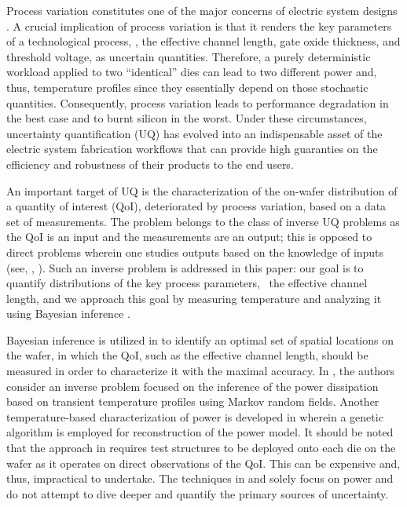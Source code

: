 Process variation constitutes one of the major concerns of electric system designs \cite{srivastava2010}. A crucial implication of process variation is that it renders the key parameters of a technological process, \eg, the effective channel length, gate oxide thickness, and threshold voltage, as uncertain quantities.
Therefore, a purely deterministic workload applied to two ``identical'' dies can lead to two different power and, thus, temperature profiles since they essentially depend on those stochastic quantities. Consequently, process variation leads to performance degradation in the best case and to burnt silicon in the worst.
Under these circumstances, uncertainty quantification (UQ) has evolved into an indispensable asset of the electric system fabrication workflows that can provide high guaranties on the efficiency and robustness of their products to the end users.

An important target of UQ is the characterization of the on-wafer distribution of a quantity of interest (QoI), deteriorated by process variation, based on a data set of measurements. The problem belongs to the class of inverse UQ problems as the QoI is an input and the measurements are an output; this is opposed to direct problems wherein one studies outputs based on the knowledge of inputs (see, \eg, \cite{juan2011, juan2012}).
Such an inverse problem is addressed in this paper: our goal is to quantify distributions of the key process parameters, \eg\ the effective channel length, and we approach this goal by measuring temperature and analyzing it using Bayesian inference \cite{gelman2004}.

Bayesian inference is utilized in \cite{zhang2010} to identify an optimal set of spatial locations on the wafer, in which the QoI, such as the effective channel length, should be measured in order to characterize it with the maximal accuracy.
In \cite{paek2012}, the authors consider an inverse problem focused on the inference of the power dissipation based on transient temperature profiles using Markov random fields.
Another temperature-based characterization of power is developed in \cite{mesa-martinez2007} wherein a genetic algorithm is employed for reconstruction of the power model.
It should be noted that the approach in \cite{zhang2010} requires test structures to be deployed onto each die on the wafer as it operates on direct observations of the QoI. This can be expensive and, thus, impractical to undertake. The techniques in \cite{paek2012} and \cite{mesa-martinez2007} solely focus on power and do not attempt to dive deeper and quantify the primary sources of uncertainty.

